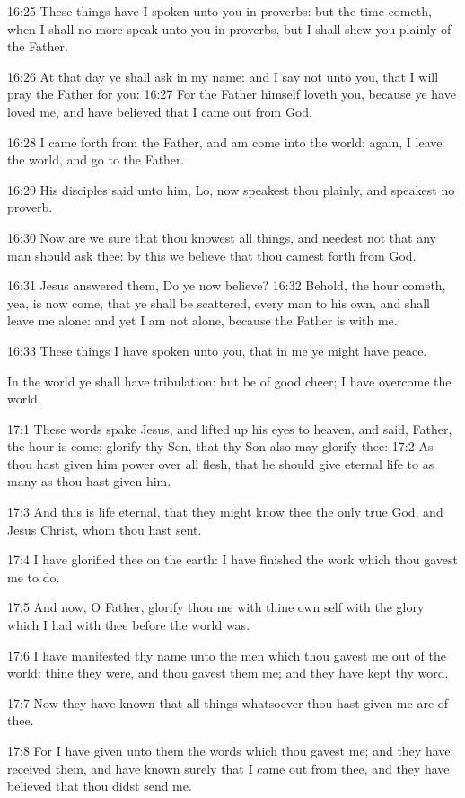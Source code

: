 16:25 These things have I spoken unto you in proverbs: but the time
cometh, when I shall no more speak unto you in proverbs, but I shall
shew you plainly of the Father.

16:26 At that day ye shall ask in my name: and I say not unto you,
that I will pray the Father for you: 16:27 For the Father himself
loveth you, because ye have loved me, and have believed that I came
out from God.

16:28 I came forth from the Father, and am come into the world: again,
I leave the world, and go to the Father.

16:29 His disciples said unto him, Lo, now speakest thou plainly, and
speakest no proverb.

16:30 Now are we sure that thou knowest all things, and needest not
that any man should ask thee: by this we believe that thou camest
forth from God.

16:31 Jesus answered them, Do ye now believe?  16:32 Behold, the hour
cometh, yea, is now come, that ye shall be scattered, every man to his
own, and shall leave me alone: and yet I am not alone, because the
Father is with me.

16:33 These things I have spoken unto you, that in me ye might have
peace.

In the world ye shall have tribulation: but be of good cheer; I have
overcome the world.

17:1 These words spake Jesus, and lifted up his eyes to heaven, and
said, Father, the hour is come; glorify thy Son, that thy Son also may
glorify thee: 17:2 As thou hast given him power over all flesh, that
he should give eternal life to as many as thou hast given him.

17:3 And this is life eternal, that they might know thee the only true
God, and Jesus Christ, whom thou hast sent.

17:4 I have glorified thee on the earth: I have finished the work
which thou gavest me to do.

17:5 And now, O Father, glorify thou me with thine own self with the
glory which I had with thee before the world was.

17:6 I have manifested thy name unto the men which thou gavest me out
of the world: thine they were, and thou gavest them me; and they have
kept thy word.

17:7 Now they have known that all things whatsoever thou hast given me
are of thee.

17:8 For I have given unto them the words which thou gavest me; and
they have received them, and have known surely that I came out from
thee, and they have believed that thou didst send me.

